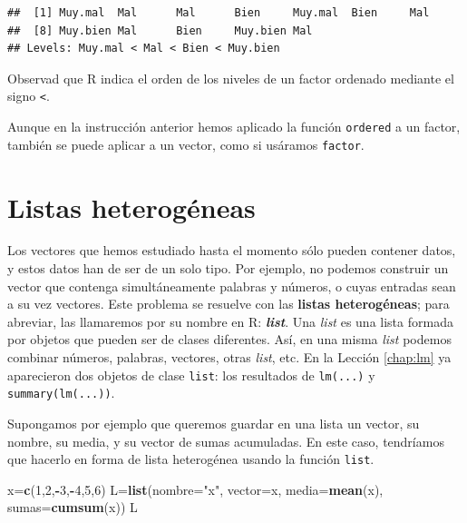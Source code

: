 \documentclass[]{book}
\newenvironment{Shaded}{\begin{snugshade}}{\end{snugshade}}
\newcommand{\DataTypeTok}[1]{\textcolor[rgb]{0.13,0.29,0.53}{#1}}
\newcommand{\DecValTok}[1]{\textcolor[rgb]{0.00,0.00,0.81}{#1}}
\newcommand{\KeywordTok}[1]{\textcolor[rgb]{0.13,0.29,0.53}{\textbf{#1}}}
\newcommand{\NormalTok}[1]{#1}
\newcommand{\OperatorTok}[1]{\textcolor[rgb]{0.81,0.36,0.00}{\textbf{#1}}}
\newcommand{\StringTok}[1]{\textcolor[rgb]{0.31,0.60,0.02}{#1}}
\theoremstyle{definition}
\theoremstyle{definition}
\theoremstyle{definition}
\theoremstyle{remark}
\begin{document}
\begin{verbatim}
##  [1] Muy.mal  Mal      Mal      Bien     Muy.mal  Bien     Mal     
##  [8] Muy.bien Mal      Bien     Muy.bien Mal     
## Levels: Muy.mal < Mal < Bien < Muy.bien
\end{verbatim}

Observad que R indica el orden de los niveles de un factor ordenado mediante el signo \texttt{\textless{}}.

Aunque en la instrucción anterior hemos aplicado la función \texttt{ordered} a un factor, también se puede aplicar a un vector, como si usáramos \texttt{factor}.

\hypertarget{sec:lists}{%
\section{Listas heterogéneas}\label{sec:lists}}

Los vectores que hemos estudiado hasta el momento sólo pueden contener datos, y estos datos han de ser de un solo tipo. Por ejemplo, no podemos construir un vector que contenga simultáneamente palabras y números, o cuyas entradas sean a su vez vectores. Este problema se resuelve con las \textbf{listas heterogéneas}; para abreviar, las llamaremos por su nombre en R: \textbf{\emph{list}}. Una \emph{list} es una lista formada por objetos que pueden ser de clases diferentes. Así, en una misma \emph{list} podemos combinar números, palabras, vectores, otras \emph{list}, etc. En la Lección \ref{chap:lm} ya aparecieron dos objetos de clase \texttt{list}: los resultados de \texttt{lm(...)} y \texttt{summary(lm(...))}.

Supongamos por ejemplo que queremos guardar en una lista un vector, su nombre, su media, y su vector de sumas acumuladas. En este caso, tendríamos que hacerlo en forma de lista heterogénea usando la función \texttt{list}.

\begin{Shaded}
\begin{Highlighting}[]
\NormalTok{x=}\KeywordTok{c}\NormalTok{(}\DecValTok{1}\NormalTok{,}\DecValTok{2}\NormalTok{,}\OperatorTok{-}\DecValTok{3}\NormalTok{,}\OperatorTok{-}\DecValTok{4}\NormalTok{,}\DecValTok{5}\NormalTok{,}\DecValTok{6}\NormalTok{)}
\NormalTok{L=}\KeywordTok{list}\NormalTok{(}\DataTypeTok{nombre=}\StringTok{"x"}\NormalTok{, }\DataTypeTok{vector=}\NormalTok{x, }\DataTypeTok{media=}\KeywordTok{mean}\NormalTok{(x), }\DataTypeTok{sumas=}\KeywordTok{cumsum}\NormalTok{(x))}
\NormalTok{L}
\end{Highlighting}
\end{Shaded}
\end{document}
